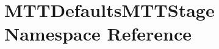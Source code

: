 \hypertarget{namespaceMTTDefaultsMTTStage}{\section{M\-T\-T\-Defaults\-M\-T\-T\-Stage Namespace Reference}
\label{namespaceMTTDefaultsMTTStage}
}
